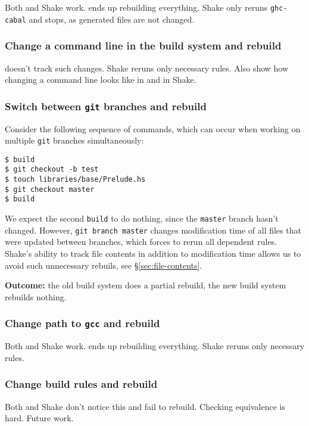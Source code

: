Both \make{} and Shake work. \make{} ends up rebuilding everything. Shake only
reruns \texttt{ghc-cabal} and stops, as generated files are not changed.

\subsubsection{Change a command line in the build system and rebuild}

\make{} doesn't track such changes. Shake reruns only necessary rules.
Also show how changing a command line looks like in \make{} and in Shake.

\subsubsection{Switch between \texttt{git} branches and rebuild}

Consider the following sequence of commands, which can occur when working on
multiple \texttt{git} branches simultaneously:

\begin{lstlisting}
$ build
$ git checkout -b test
$ touch libraries/base/Prelude.hs
$ git checkout master
$ build
\end{lstlisting}

We expect the second \texttt{build} to do nothing, since the \texttt{master}
branch hasn't changed. However, \texttt{git branch master} changes modification
time of all files that were updated between branches, which forces \make{} to
rerun all dependent rules. Shake's ability to track file contents in addition to
modification time allows us to avoid such unnecessary rebuils, see
\S\ref{sec:file-contents}.

\textbf{Outcome:} the old build system does a partial rebuild, the new build
system rebuilds nothing.

\subsubsection{Change path to \texttt{gcc} and rebuild}

Both \make{} and Shake work. \make{} ends up rebuilding everything. Shake reruns
only necessary rules.

\subsubsection{Change build rules and rebuild}

Both \make{} and Shake don't notice this and fail to rebuild. Checking
equivalence is hard. Future work.

